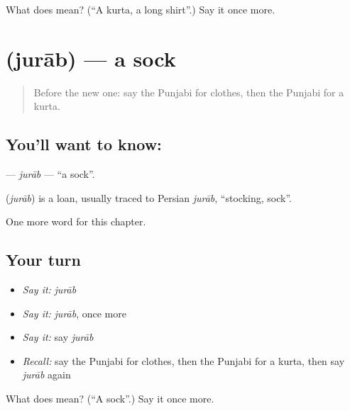 \begin{tcolorbox}[breakable,colback=teal!4,colframe=teal!35!black,title={Before you move on}]
What does  mean? (\textquotedblleft{}A kurta, a long shirt\textquotedblright{}.) Say it once more.
\end{tcolorbox}
\section[\texorpdfstring{\pa{ਜੁਰਾਬ} (jurāb)}{ਜੁਰਾਬ (jurāb)}]{ (jurāb) — a sock}

\label{lesson:PA-C93-jurab}



\begin{quote}
Before the new one: say the Punjabi for clothes, then the Punjabi for a kurta.
\end{quote}

\subsection*{You'll want to know: }
\textbf{} — \emph{jurāb} — \textquotedblleft{}a sock\textquotedblright{}.

\begin{cousinweb}
\textbf{} (\emph{jurāb}) is a loan, usually traced to Persian \emph{jurāb}, \textquotedblleft{}stocking, sock\textquotedblright{}.
\end{cousinweb}

\begin{grammarlens}[title={What you've built}]
One more word for this chapter.
\end{grammarlens}

\subsection*{Your turn}
\begin{itemize}
\raggedright
  \item \emph{Say it:} \emph{jurāb}
  \item \emph{Say it:} \emph{jurāb}, once more
  \item \emph{Say it:} say \emph{jurāb}
  \item \emph{Recall:} say the Punjabi for clothes, then the Punjabi for a kurta, then say \emph{jurāb} again
\end{itemize}

\begin{tcolorbox}[breakable,colback=teal!4,colframe=teal!35!black,title={Before you move on}]
What does  mean? (\textquotedblleft{}A sock\textquotedblright{}.) Say it once more.
\end{tcolorbox}
